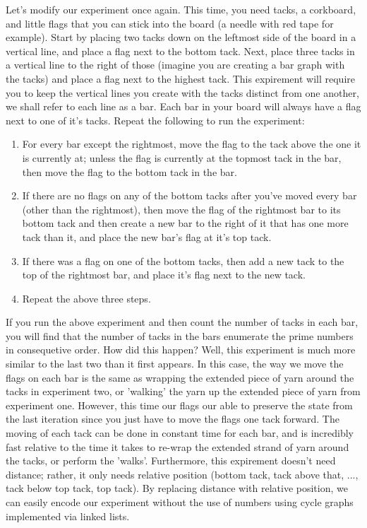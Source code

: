 \documentclass[a4paper,12pt]{article}
\begin{document}
Let's modify our experiment once again. This time, you need tacks, a corkboard, and little flags that you can stick into the board (a needle with red tape for example). Start by placing two tacks down on the leftmost side of the board in a vertical line, and place a flag next to the bottom tack. Next, place three tacks in a vertical line to the right of those (imagine you are creating a bar graph with the tacks) and place a flag next to the highest tack. This expirement will require you to keep the vertical lines you create with the tacks distinct from one another, we shall refer to each line as a bar. Each bar in your board will always have a flag next to one of it's tacks. Repeat the following to run the experiment:
\begin{enumerate}
\item For every bar except the rightmost, move the flag to the tack above the one it is currently at; unless the flag is currently at the topmost tack in the bar, then move the flag to the bottom tack in the bar.
\item If there are no flags on any of the bottom tacks after you've moved every bar (other than the rightmost), then move the flag of the rightmost bar to its bottom tack and then create a new bar to the right of it that has one more tack than it, and place the new bar's flag at it's top tack.  
\item If there was a flag on one of the bottom tacks, then add a new tack to the top of the rightmost bar, and place it's flag next to the new tack.
\item Repeat the above three steps. 
\end{enumerate}

If you run the above experiment and then count the number of tacks in each bar, you will find that the number of tacks in the bars enumerate the prime numbers in consequetive order. How did this happen? Well, this experiment is much more similar to the last two than it first appears. In this case, the way we move the flags on each bar is the same as wrapping the extended piece of yarn around the tacks in experiment two, or 'walking' the yarn up the extended piece of yarn from experiment one. However, this time our flags our able to preserve the state from the last iteration since you just have to move the flags one tack forward. The moving of each tack can be done in constant time for each bar, and is incredibly fast relative to the time it takes to re-wrap the extended strand of yarn around the tacks, or perform the 'walks'. Furthermore, this expirement doesn't need distance; rather, it only needs relative position (bottom tack, tack above that, ..., tack below top tack, top tack). By replacing distance with relative position, we can easily encode our experiment without the use of numbers using cycle graphs implemented via linked lists. 
  
\end{document}
